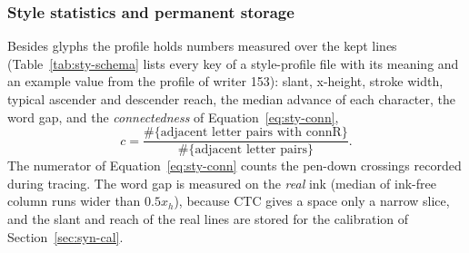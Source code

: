 \subsubsection{Style statistics and permanent storage}

Besides glyphs the profile holds numbers measured over the kept lines (Table~\ref{tab:sty-schema} lists every key of a style-profile file with its meaning and an example value from the profile of writer 153): slant, x-height, stroke width, typical ascender and descender reach, the median advance of each character, the word gap, and the \emph{connectedness} of Equation~\ref{eq:sty-conn},
\begin{equation}
c=\frac{\#\{\text{adjacent letter pairs with }\mathrm{connR}\}}{\#\{\text{adjacent letter pairs}\}}.
\label{eq:sty-conn}
\end{equation}
The numerator of Equation~\ref{eq:sty-conn} counts the pen-down crossings recorded during tracing.
The word gap is measured on the \emph{real} ink (median of ink-free column runs wider than $0.5x_h$), because CTC gives a space only a narrow slice, and the slant and reach of the real lines are stored for the calibration of Section~\ref{sec:syn-cal}.

